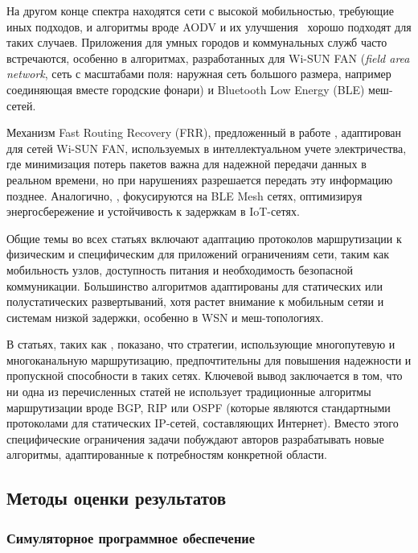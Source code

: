 \documentclass[%
]{report}
\begin{document}
На другом конце спектра находятся сети
с высокой мобильностью, требующие иных подходов,
и алгоритмы вроде AODV и их улучшения~\cite{LIU201321}
хорошо подходят для таких случаев.
Приложения для умных городов и коммунальных служб
часто встречаются, особенно в алгоритмах,
разработанных для Wi-SUN FAN (\emph{field area network},
сеть с масштабами поля: наружная сеть большого размера,
например соединяющая вместе городские фонари)
и Bluetooth Low Energy (BLE) меш-сетей.

Механизм Fast Routing Recovery (FRR),
предложенный в работе \textcite{HECK2025110364},
адаптирован для сетей Wi-SUN FAN,
используемых в интеллектуальном учете электричества,
где минимизация потерь пакетов важна для
надежной передачи данных в реальном времени,
но при нарушениях разрешается передать эту информацию позднее.
Аналогично, \textcite{HERNANDEZSOLANA2022109114},
фокусируются на BLE Mesh сетях,
оптимизируя энергосбережение и устойчивость к задержкам
в IoT-сетях.

Общие темы во всех статьях включают
адаптацию протоколов маршрутизации к
физическим и специфическим для приложений
ограничениям сети, таким как мобильность узлов,
доступность питания и необходимость безопасной
коммуникации. Большинство алгоритмов адаптированы
для статических или полустатических развертываний,
хотя растет внимание к мобильным сетяи и системам низкой задержки,
особенно в WSN и меш-топологиях.

В статьях, таких как \textcite{LI2011458},
показано, что стратегии, использующие многопутевую
и многоканальную маршрутизацию, предпочтительны для
повышения надежности и пропускной способности в таких сетях.
Ключевой вывод заключается в том, что ни
одна из перечисленных статей не использует
традиционные алгоритмы маршрутизации вроде
BGP, RIP или OSPF (которые являются стандартными
протоколами для статических IP-сетей,
составляющих Интернет). Вместо этого специфические
ограничения задачи побуждают авторов разрабатывать
новые алгоритмы, адаптированные к потребностям
конкретной области.

\subsection{Методы оценки результатов}\label{measuring-outcomes}

\subsubsection{Симуляторное программное обеспечение}\label{simulator-software}
\end{document}
